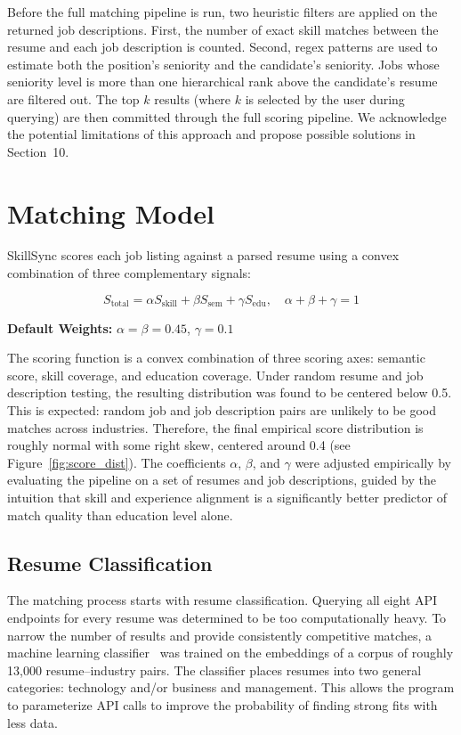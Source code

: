 \documentclass[12pt]{article}
\begin{document}
Before the full matching pipeline is run, two heuristic filters are applied on the returned job descriptions. 
First, the number of exact skill matches between the resume and each job description is counted. Second, regex patterns are used to estimate both the position's seniority and the candidate's seniority.
Jobs whose seniority level is more than one hierarchical rank above the candidate's resume are filtered out. 
The top $k$ results (where $k$ is selected by the user during querying) are then committed through the full scoring pipeline.
We acknowledge the potential limitations of this approach and propose possible solutions in Section~10.

\section{Matching Model}

SkillSync scores each job listing against a parsed resume using a convex combination of three complementary signals:

\begin{equation}
    S_{\text{total}} = \alpha S_{\text{skill}} + \beta S_{\text{sem}} + \gamma S_{\text{edu}}, \quad \alpha + \beta + \gamma = 1
\end{equation}

\noindent\textbf{Default Weights:} $\alpha = \beta = 0.45$, $\gamma = 0.1$

The scoring function is a convex combination of three scoring axes: semantic score, skill coverage, and education coverage. 
Under random resume and job description testing, the resulting distribution was found to be centered below 0.5. 
This is expected: random job and job description pairs are unlikely to be good matches across industries. 
Therefore, the final empirical score distribution is roughly normal with some right skew, centered around 0.4 (see Figure~\ref{fig:score_dist}).
The coefficients $\alpha$, $\beta$, and $\gamma$ were adjusted empirically by evaluating the pipeline on a set of resumes and job descriptions, guided by the intuition that skill and 
experience alignment is a significantly better predictor of match quality than education level alone.

\subsection{Resume Classification}

The matching process starts with resume classification.
Querying all eight API endpoints for every resume was determined to be too computationally heavy.
To narrow the number of results and provide consistently competitive matches, a machine learning classifier~\cite{scikit-learn} was trained on the embeddings of a corpus of roughly 13,000 resume--industry pairs.
The classifier places resumes into two general categories: technology and/or business and management. This allows the program to parameterize API calls to improve the probability of finding strong fits with less data.
\end{document}
